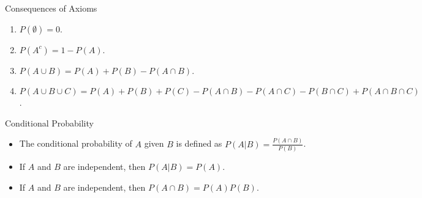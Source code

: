 \documentclass[handout]{beamer}
\begin{document}
\begin{frame}{Consequences of Axioms}
    \begin{enumerate}
        \item $P(\emptyset) = 0$.
        \item $P(A^c) = 1 - P(A)$.
        \item $P(A \cup B) = P(A) + P(B) - P(A \cap B)$.
        \item $P(A \cup B \cup C) = P(A) + P(B) + P(C) - P(A \cap B) - P(A \cap C) - P(B \cap C) + P(A \cap B \cap C)$.
    \end{enumerate}
\end{frame}
    
\begin{frame}{Conditional Probability}
    \begin{itemize}
        \item The conditional probability of $A$ given $B$ is defined as $P(A|B) = \frac{P(A \cap B)}{P(B)}$.
        \item If $A$ and $B$ are independent, then $P(A|B) = P(A)$.
        \item If $A$ and $B$ are independent, then $P(A \cap B) = P(A)P(B)$.
    \end{itemize}
    
\end{frame}
\end{document}

